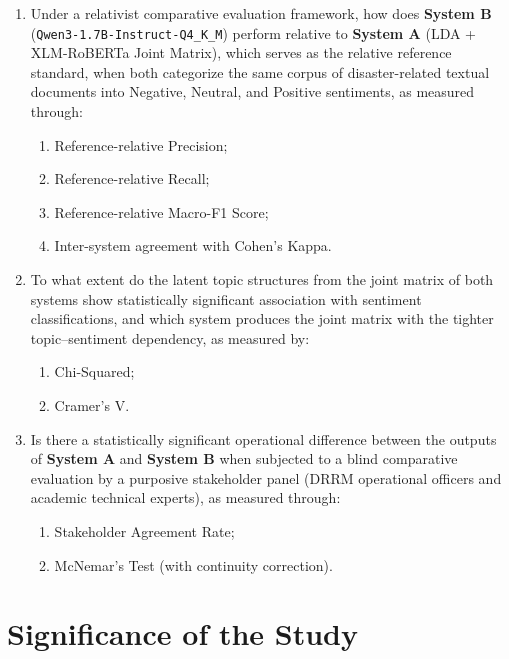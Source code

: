 \documentclass[12pt,a4paper]{report}
\newcommand{\sysA}{\textbf{System A}}
\newcommand{\sysB}{\textbf{System B}}
\newcommand{\qwen}{\texttt{Qwen3-1.7B-Instruct-Q4\_K\_M}}
\newcommand{\xlmr}{XLM-RoBERTa}
\begin{document}
\begin{enumerate}[label=\arabic*.]
  \item Under a relativist comparative evaluation framework, how does \sysB{}
        (\qwen) perform relative to \sysA{} (LDA + \xlmr{} Joint Matrix),
        which serves as the relative reference standard, when both categorize
        the same corpus of disaster-related textual documents into Negative,
        Neutral, and Positive sentiments, as measured through:
        \begin{enumerate}[label=\alph*.]
          \item Reference-relative Precision;
          \item Reference-relative Recall;
          \item Reference-relative Macro-F1 Score;
          \item Inter-system agreement with Cohen's Kappa.
        \end{enumerate}

  \item To what extent do the latent topic structures from the joint matrix of
        both systems show statistically significant association with sentiment
        classifications, and which system produces the joint matrix with the
        tighter topic--sentiment dependency, as measured by:
        \begin{enumerate}[label=\alph*.]
          \item Chi-Squared;
          \item Cramer's V.
        \end{enumerate}

  \item Is there a statistically significant operational difference between
        the outputs of \sysA{} and \sysB{} when subjected to a blind
        comparative evaluation by a purposive stakeholder panel (DRRM
        operational officers and academic technical experts), as measured
        through:
        \begin{enumerate}[label=\alph*.]
          \item Stakeholder Agreement Rate;
          \item McNemar's Test (with continuity correction).
        \end{enumerate}
\end{enumerate}

\section{Significance of the Study}
\end{document}
